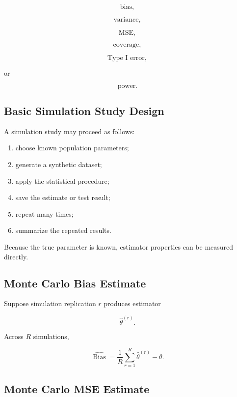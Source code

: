 \[
\boxed{
\text{bias},
}
\]

\[
\boxed{
\text{variance},
}
\]

\[
\boxed{
\text{MSE},
}
\]

\[
\boxed{
\text{coverage},
}
\]

\[
\boxed{
\text{Type I error},
}
\]

or

\[
\boxed{
\text{power}.
}
\]

\subsection{Basic Simulation Study Design}
\label{subsec:simulation-study-design}

A simulation study may proceed as follows:

\begin{enumerate}
    \item choose known population parameters;
    \item generate a synthetic dataset;
    \item apply the statistical procedure;
    \item save the estimate or test result;
    \item repeat many times;
    \item summarize the repeated results.
\end{enumerate}

Because the true parameter is known, estimator properties can be measured
directly.

\subsection{Monte Carlo Bias Estimate}
\label{subsec:simulation-bias}

Suppose simulation replication \(r\) produces estimator

\[
\widehat{\theta}^{(r)}.
\]

Across \(R\) simulations,

\[
\boxed{
\widehat{\operatorname{Bias}}
=
\frac1R
\sum_{r=1}^{R}
\widehat{\theta}^{(r)}
-
\theta.
}
\]

\subsection{Monte Carlo MSE Estimate}
\label{subsec:simulation-mse}

